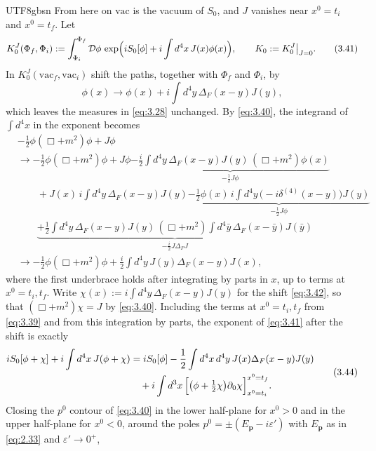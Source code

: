 \documentclass[11pt,a4paper,oneside]{report}
\begin{document}
\begin{CJK*}{UTF8}{gbsn}
From here on $\mathrm{vac}$ is the vacuum of $S_0$, and $J$ vanishes near $x^0=t_i$ and $x^0=t_f$. Let
\begin{equation*}
K_0^J(\Phi_f,\Phi_i):=\int_{\Phi_i}^{\Phi_f}\mathcal D\phi\,\exp\Bigl(iS_0[\phi]+i\int d^4x\,J(x)\phi(x)\Bigr),
\qquad K_0:=K_0^J\big|_{J=0}.
\tag{3.41}\label{eq:3.41}
\end{equation*}
In $K_0^J(\mathrm{vac}_f,\mathrm{vac}_i)$ shift the paths, together with $\Phi_f$ and $\Phi_i$, by
\begin{equation*}
\phi(x)\to\phi(x)+i\int d^4y\,\Delta_F(x-y)J(y),
\tag{3.42}\label{eq:3.42}
\end{equation*}
which leaves the measures in \eqref{eq:3.28} unchanged. By \eqref{eq:3.40}, the integrand of $\int d^4x$ in the exponent becomes
\begin{equation*}
\begin{aligned}
&-\frac12\phi(\Box+m^2)\phi+J\phi\\
&\to-\frac12\phi(\Box+m^2)\phi+J\phi
\underbrace{-\frac i2\int d^4y\,\Delta_F(x-y)J(y)\,(\Box+m^2)\phi(x)}_{-\frac12J\phi}\\
&\qquad+J(x)\,i\int d^4y\,\Delta_F(x-y)J(y)
\underbrace{-\frac12\phi(x)\,i\int d^4y\,\bigl(-i\delta^{(4)}(x-y)\bigr)J(y)}_{-\frac12J\phi}\\
&\qquad\underbrace{+\frac12\int d^4y\,\Delta_F(x-y)J(y)\,(\Box+m^2)\int d^4\bar y\,\Delta_F(x-\bar y)J(\bar y)}_{-\frac i2J\Delta_FJ}\\
&\to-\frac12\phi(\Box+m^2)\phi+\frac i2\int d^4y\,J(y)\Delta_F(x-y)J(x),
\end{aligned}
\tag{3.43}\label{eq:3.43}
\end{equation*}
where the first underbrace holds after integrating by parts in $x$, up to terms at $x^0=t_i,t_f$. Write $\chi(x):=i\int d^4y\,\Delta_F(x-y)J(y)$ for the shift \eqref{eq:3.42}, so that $(\Box+m^2)\chi=J$ by \eqref{eq:3.40}. Including the terms at $x^0=t_i,t_f$ from \eqref{eq:3.39} and from this integration by parts, the exponent of \eqref{eq:3.41} after the shift is exactly
\begin{equation*}
\begin{aligned}
iS_0[\phi+\chi]+i\int d^4x\,J(\phi+\chi)
&=iS_0[\phi]-\frac12\int d^4x\,d^4y\,J(x)\Delta_F(x-y)J(y)\\
&\quad+i\int d^3x\,\Bigl[\bigl(\phi+\tfrac12\chi\bigr)\partial_0\chi\Bigr]_{x^0=t_i}^{x^0=t_f}.
\end{aligned}
\tag{3.44}\label{eq:3.44}
\end{equation*}
Closing the $p^0$ contour of \eqref{eq:3.40} in the lower half-plane for $x^0>0$ and in the upper half-plane for $x^0<0$, around the poles $p^0=\pm(E_{\mathbf p}-i\varepsilon')$ with $E_{\mathbf p}$ as in \eqref{eq:2.33} and $\varepsilon'\to0^+$,

\end{CJK*}
\end{document}
